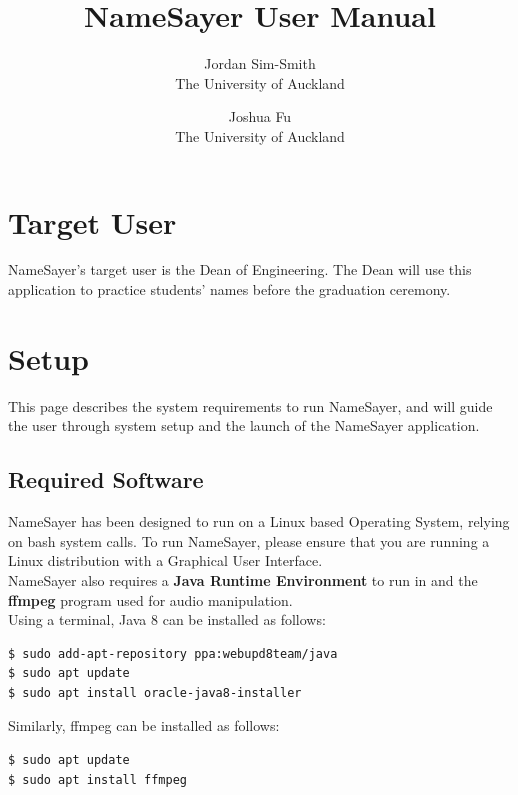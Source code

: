 \documentclass{article}
\begin{document}
\title{NameSayer User Manual}
\author{Jordan Sim-Smith \\
		The University of Auckland \\
		\and
		Joshua Fu \\
		The University of Auckland \\
		}

\maketitle

\clearpage

\tableofcontents

\clearpage

\section*{Target User}
NameSayer's target user is the Dean of Engineering. The Dean will use this
application to practice students' names before the graduation ceremony.

\section{Setup}

This page describes the system requirements to run NameSayer, and will guide the
user through system setup and the launch of the NameSayer application.

\subsection{Required Software}

NameSayer has been designed to run on a Linux based Operating System, relying on
bash system calls. To run NameSayer, please ensure that you are running a Linux
distribution with a Graphical User Interface. \\

NameSayer also requires a \textbf{Java Runtime Environment} to run in and the
\textbf{ffmpeg} program used for audio manipulation. \\

Using a terminal, Java 8 can be installed as follows:
\begin{verbatim}
$ sudo add-apt-repository ppa:webupd8team/java
$ sudo apt update
$ sudo apt install oracle-java8-installer
\end{verbatim}

Similarly, ffmpeg can be installed as follows:
\begin{verbatim}
$ sudo apt update
$ sudo apt install ffmpeg
\end{verbatim}
\end{document}
